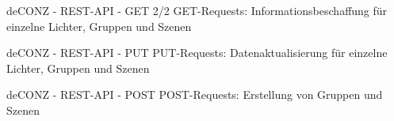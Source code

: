 \begin{frame}{deCONZ - REST-API - GET 2/2}
  \Large
  GET-Requests: Informationsbeschaffung
  \flushleft
  für \alert{einzelne} Lichter, Gruppen und Szenen
\end{frame}

\begin{frame}{deCONZ - REST-API - PUT}
  \Large
  PUT-Requests: Datenaktualisierung
  \flushleft
  für \alert{einzelne} Lichter, Gruppen und Szenen
\end{frame}

\begin{frame}{deCONZ - REST-API - POST}
  \Large
  POST-Requests: Erstellung
  \flushleft
  von Gruppen und Szenen
\end{frame}

